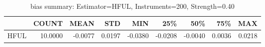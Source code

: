 \begin{table}[ht]
\centering
\caption{bias summary: Estimator=HFUL, Instruments=200, Strength=0.40}
\begin{tabular}{lrrrrrrrr}
\toprule
 & COUNT & MEAN & STD & MIN & 25\% & 50\% & 75\% & MAX \\
\midrule
HFUL & 10.0000 & -0.0077 & 0.0197 & -0.0380 & -0.0208 & -0.0040 & 0.0036 & 0.0218 \\
\bottomrule
\end{tabular}
\end{table}
